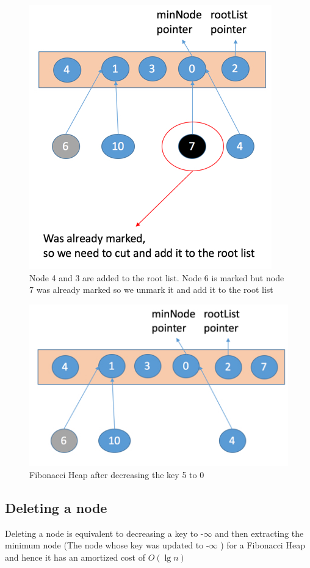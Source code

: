 \begin{figure}[h]
	\centering 
	\includegraphics[width=0.95\columnwidth,height=0.75\columnwidth]{Figures/FibonacciHeapDecreaseKeyVilolation3Operation}
	\caption{Node 4 and 3 are added to the root list. Node 6 is marked but node 7 was already marked so we unmark it and add it to the root list}
	\label {fig:decreaseKey3Violation}
\end{figure}
\begin{figure}[h]
	\centering \includegraphics[width=0.95\columnwidth,height=0.75\columnwidth]{Figures/FibonacciHeapDecreaseKeyVilolation4Operation}
	\caption{Fibonacci Heap after decreasing the key 5 to 0}
	\label {fig:decreaseKey4Violation}
\end{figure}


\subsection{Deleting a node}
Deleting a node is equivalent to decreasing a key to -$ \infty $ and then extracting the minimum node (The node whose key was updated to -$ \infty $ ) for a Fibonacci Heap and hence it has an amortized cost of $O(\lg{n})$ \\ \\ 
